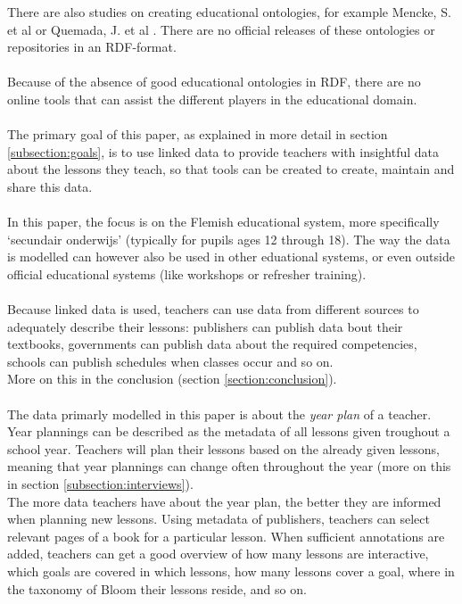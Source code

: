 \documentclass[a4paper]{report}
\begin{document}
    There are also studies on creating educational ontologies, for example Mencke, S. et al \cite{hierarchy} or Quemada, J. et al \cite{usecasebased}. There are no official releases of these ontologies or repositories in an RDF-format.\\ \\
    Because of the absence of good educational ontologies in RDF, there are no online tools that can assist the different players in the educational domain. \\ \\
    The primary goal of this paper, as explained in more detail in section \ref{subsection:goals}, is to use linked data to provide teachers with insightful data about the lessons they teach, so that tools can be created to create, maintain and share this data. \\ \\
    In this paper, the focus is on the Flemish educational system, more specifically `secundair onderwijs' (typically for pupils ages 12 through 18). The way the data is modelled can however also be used in other eduational systems, or even outside official educational systems (like workshops or refresher training).\\ \\
    Because linked data is used, teachers can use data from different sources to adequately describe their lessons: publishers can publish data bout their textbooks, governments can publish data about the required competencies, schools can publish schedules when classes occur and so on.\\
    More on this in the conclusion (section \ref{section:conclusion}).\\ \\
    The data primarly modelled in this paper is about the \textit{year plan} of a teacher. Year plannings can be described as the metadata of all lessons given troughout a school year.
    Teachers will plan their lessons based on the already given lessons, meaning that year plannings can change often throughout the year (more on this in section \ref{subsection:interviews}). \\
    The more data teachers have about the year plan, the better they are informed when planning new lessons.
    Using metadata of publishers, teachers can select relevant pages of a book for a particular lesson.
    When sufficient annotations are added, teachers can get a good overview of how many lessons are interactive, which goals are covered in which lessons, how many lessons cover a goal, where in the taxonomy of Bloom their lessons reside, and so on.
\end{document}
